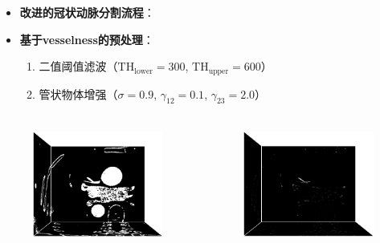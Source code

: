 \begin{frame}
\begin{itemize}
  \item \textbf{改进的冠状动脉分割流程}：
\end{itemize}
\begin{figure}[t]
\centering

\end{figure}
\end{frame}

\begin{frame}
\begin{itemize}
  \item \textbf{基于vesselness的预处理}：
  \begin{enumerate}
    \pause \item 二值阈值滤波（$\text{TH}_{\text{lower}} = 300$, $\text{TH}_{\text{upper}} = 600$）
    \pause \item 管状物体增强（$\sigma = 0.9$, $\gamma_{12} = 0.1$, $\gamma_{23} = 2.0$）
  \end{enumerate}
\end{itemize}
\begin{columns}[b,onlytextwidth]
\begin{column}{.5\textwidth}
\pause \begin{figure}[t]
\centering
\includegraphics[height=1.5in]{../../Figures/coronary/coronary_enhanced/binary1.eps}
\end{figure}
\end{column}
\begin{column}{.5\textwidth}
\pause \begin{figure}[t]
\centering
\includegraphics[height=1.5in]{../../Figures/coronary/coronary_enhanced/hessian.eps}
\end{figure}
\end{column}
\end{columns}
\end{frame}

